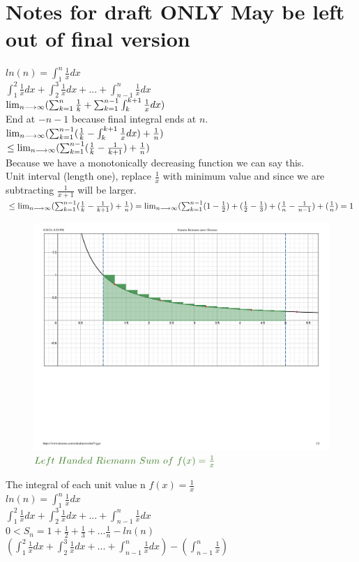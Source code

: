 \documentclass{article}
\newcommand{\lra}{\ensuremath\longrightarrow}
\begin{document}
\section{Notes for draft ONLY May be left out of final version}
$ln(n) = \int_1^n \frac{1}{x}dx$\\
$\int_1^2 \frac{1}{x}dx+\int_2^3 \frac{1}{x}dx+...+\int_{n-1}^n \frac{1}{x}dx$\\
$\lim_{n\lra\infty}(\sum_{k=1}^{n} \frac{1}{k} + \sum_{k=1}^{n-1} \int_k^{k+1}\frac{1}{x}dx)$\\
End at $-n-1$ because final integral ends at $n$.\\
$\lim_{n\lra\infty}(\sum_{k=1}^{n-1} (\frac{1}{k} - \int_k^{k+1}\frac{1}{x}dx)+\frac{1}{n})$\\
$\leq \lim_{n\lra\infty}(\sum_{k=1}^{n-1} (\frac{1}{k} - \frac{1}{k+1})+\frac{1}{n})$\\
Because we have a monotonically decreasing function we can say this.\\
Unit interval (length one), replace $\frac{1}{x}$ with minimum value and since we are subtracting $\frac{1}{x+1}$ will be larger.\\
$\leq \lim_{n\lra\infty}(\sum_{k=1}^{n-1} (\frac{1}{k} - \frac{1}{k+1})+\frac{1}{n})=\lim_{n\lra\infty}(\sum_{k=1}^{n-1}(1-\frac{1}{2})+(\frac{1}{2}-\frac{1}{3})+(\frac{1}{n}-\frac{1}{n-1})+(\frac{1}{n}) = 1$ 
\begin{figure}[htp]
    \centering
    \includegraphics[scale=0.5]{Gamma Reimann sums _ Desmos.pdf}
    \caption{$\textcolor{OliveGreen}{Left\  Handed\  Riemann\  Sum\  of\  f(x)=\frac{1}{x}}$}
    \label{fig:Riemann Sums}
\end{figure}
The integral of each unit value n
$f(x)=\frac{1}{x}$\\
$ln(n) = \int_1^n \frac{1}{x}dx$\\
$\int_1^2 \frac{1}{x}dx+\int_2^3 \frac{1}{x}dx+...+\int_{n-1}^n \frac{1}{x}dx$\\
$0 < S_n=1+\frac{1}{2}+\frac{1}{3}+...\frac{1}{n}-ln(n)$\\
$(\int_1^2 \frac{1}{x}dx+\int_2^3 \frac{1}{x}dx+...+\int_{n-1}^n \frac{1}{x}dx)-(\int_{n-1}^n \frac{1}{x})$\\
\end{document}

